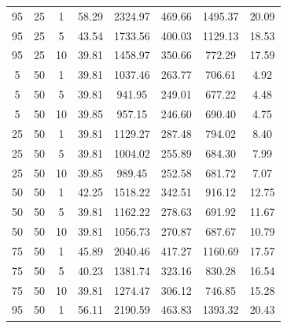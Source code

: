 \begin{table}[H]
\begin{tabular}{ccc|c|c|c|c|c}
95 & 25 & 1 & \cellcolor{gray!1}58.29 & \cellcolor{gray!1}2324.97 & \cellcolor{gray!1}469.66 & \cellcolor{gray!1}1495.37 & 20.09\\
95 & 25 & 5 & \cellcolor{gray!43}43.54 & \cellcolor{gray!1}1733.56 & \cellcolor{gray!1}400.03 & \cellcolor{gray!1}1129.13 & 18.53\\
95 & 25 & 10 & \cellcolor{gray!80}39.81 & \cellcolor{gray!1}1458.97 & \cellcolor{gray!1}350.66 & \cellcolor{gray!46}772.29 & 17.59\\
5 & 50 & 1 & \cellcolor{gray!80}39.81 & \cellcolor{gray!28}1037.46 & \cellcolor{gray!1}263.77 & \cellcolor{gray!66}706.61 & 4.92\\
5 & 50 & 5 & \cellcolor{gray!80}39.81 & \cellcolor{gray!44}941.95 & \cellcolor{gray!13}249.01 & \cellcolor{gray!75}677.22 & 4.48\\
5 & 50 & 10 & \cellcolor{gray!80}39.85 & \cellcolor{gray!42}957.15 & \cellcolor{gray!15}246.60 & \cellcolor{gray!71}690.40 & 4.75\\
25 & 50 & 1 & \cellcolor{gray!80}39.81 & \cellcolor{gray!13}1129.27 & \cellcolor{gray!1}287.48 & \cellcolor{gray!39}794.02 & 8.40\\
25 & 50 & 5 & \cellcolor{gray!80}39.81 & \cellcolor{gray!34}1004.02 & \cellcolor{gray!6}255.89 & \cellcolor{gray!73}684.30 & 7.99\\
25 & 50 & 10 & \cellcolor{gray!80}39.85 & \cellcolor{gray!37}989.45 & \cellcolor{gray!10}252.58 & \cellcolor{gray!74}681.72 & 7.07\\
50 & 50 & 1 & \cellcolor{gray!56}42.25 & \cellcolor{gray!1}1518.22 & \cellcolor{gray!1}342.51 & \cellcolor{gray!2}916.12 & 12.75\\
50 & 50 & 5 & \cellcolor{gray!80}39.81 & \cellcolor{gray!8}1162.22 & \cellcolor{gray!1}278.63 & \cellcolor{gray!71}691.92 & 11.67\\
50 & 50 & 10 & \cellcolor{gray!80}39.81 & \cellcolor{gray!25}1056.73 & \cellcolor{gray!1}270.87 & \cellcolor{gray!72}687.67 & 10.79\\
75 & 50 & 1 & \cellcolor{gray!19}45.89 & \cellcolor{gray!1}2040.46 & \cellcolor{gray!1}417.27 & \cellcolor{gray!1}1160.69 & 17.57\\
75 & 50 & 5 & \cellcolor{gray!76}40.23 & \cellcolor{gray!1}1381.74 & \cellcolor{gray!1}323.16 & \cellcolor{gray!28}830.28 & 16.54\\
75 & 50 & 10 & \cellcolor{gray!80}39.81 & \cellcolor{gray!1}1274.47 & \cellcolor{gray!1}306.12 & \cellcolor{gray!54}746.85 & 15.28\\
95 & 50 & 1 & \cellcolor{gray!1}56.11 & \cellcolor{gray!1}2190.59 & \cellcolor{gray!1}463.83 & \cellcolor{gray!1}1393.32 & 20.43\\

\end{tabular}
\end{table}
